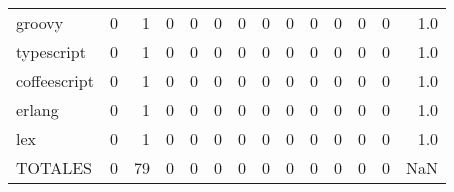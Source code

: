 \begin{tabular}{lrrrrrrrrrrrrr}
groovy       &        0 &       1 &          0 &               0 &                0 &       0 &          0 &         0 &         0 &      0 &             0 &         0 &      1.0 \\
typescript   &        0 &       1 &          0 &               0 &                0 &       0 &          0 &         0 &         0 &      0 &             0 &         0 &      1.0 \\
coffeescript &        0 &       1 &          0 &               0 &                0 &       0 &          0 &         0 &         0 &      0 &             0 &         0 &      1.0 \\
erlang       &        0 &       1 &          0 &               0 &                0 &       0 &          0 &         0 &         0 &      0 &             0 &         0 &      1.0 \\
lex          &        0 &       1 &          0 &               0 &                0 &       0 &          0 &         0 &         0 &      0 &             0 &         0 &      1.0 \\
TOTALES      &        0 &      79 &          0 &               0 &                0 &       0 &          0 &         0 &         0 &      0 &             0 &         0 &      NaN \\
\bottomrule
\end{tabular}
